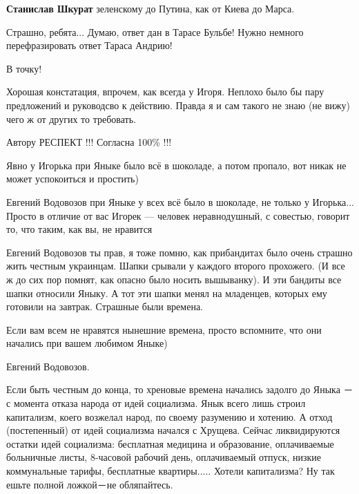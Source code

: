 \begin{itemize}
\begin{itemize}
\textbf{Станислав Шкурат} зеленскому до Путина, как от Киева до Марса.

\end{itemize}


Страшно, ребята... Думаю, ответ дан в Тарасе Бульбе! Нужно немного
перефразировать ответ Тараса Андрию!

В точку!


Хорошая констатация, впрочем, как всегда у Игоря. Неплохо было бы пару
предложений и руководсво к действию. Правда я и сам такого не знаю (не вижу)
чего ж от других то требовать.

Автору РЕСПЕКТ !!! Согласна 100\% !!!


Явно у Игорька при Яныке было всё в шоколаде, а потом пропало, вот никак не
может успокоиться и простить)

\begin{itemize}

Евгений Водовозов при Яныке у всех всё было в шоколаде, не только у Игорька...
Просто в отличие от вас Игорек — человек неравнодушный, с совестью, говорит то,
что таким, как вы, не нравится


Евгений Водовозов ты прав, я тоже помню, как прибандитах было очень страшно
жить честным украинцам. Шапки срывали у каждого второго прохожего. (И все ж до
сих пор помнят, как опасно было носить вышыванку). И эти бандиты все шапки
относили Яныку. А тот эти шапки менял на младенцев, которых ему готовили на
завтрак. Страшные были времена.


Если вам всем не нравятся нынешние времена, просто вспомните, что они начались при вашем любимом Яныке)

Евгений Водовозов.

Если быть честным до конца, то хреновые времена начались задолго до Яныка －с
момента отказа народа от идей социализма.  Янык всего лишь строил капитализм,
коего возжелал народ, по своему разумению и хотению.  А отход (постепенный) от
идей социализма начался с Хрущева.  Сейчас ликвидируются остатки идей
социализма: бесплатная медицина и образование, оплачиваемые больничные листы,
8-часовой рабочий день, оплачиваемый отпуск, низкие коммунальные тарифы,
бесплатные квартиры.....  Хотели капитализма?  Ну так ешьте полной ложкой－не
обляпайтесь.


\end{itemize}
\end{itemize}
